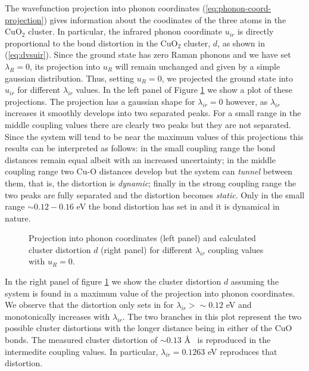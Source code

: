 The wavefunction projection into phonon coordinates (\ref{eq:phonon-coord-projection}) gives information about the coodinates of the three atoms in the CuO$_2$ cluster.
In particular, the infrared phonon coordinate $u_{ir}$ is directly proportional to the bond distortion in the CuO$_2$ cluster, $d$, as shown in (\ref{eq:dvsuir}).
Since the ground state has zero Raman phonons and we have set $\lambda_R=0$, its projection into $u_R$ will remain unchanged and given by a simple gaussian distribution.
Thus, setting $u_R=0$, we projected the ground state into $u_{ir}$ for different $\lambda_{ir}$ values.
In the left panel of Figure \ref{fig:uirCoupl} we show a plot of these projections.
The projection has a gaussian shape for $\lambda_{ir}=0$ however, as $\lambda_{ir}$ increases it smoothly develops into two separated peaks.
For a small range in the middle coupling values there are clearly two peaks but they are not separated. 
Since the system will tend to be near the maximum values of this projections this results can be interpreted as follows: in the small coupling range the bond distances remain equal albeit with an increased uncertainty; in the middle coupling range two Cu-O distances develop but the system can \textit{tunnel} between them, that is, the distortion is \textit{dynamic}; finally in the strong coupling range the two peaks are fully separated and the distortion becomes \textit{static}.
Only in the small range $\sim 0.12 - 0.16$ eV the bond distortion has set in and it is dynamical in nature.
%
\begin{figure}[ht]
  \centering
  
  \caption{Projection into phonon coordinates (left panel) and calculated cluster distortion $d$ (right panel) for different $\lambda_{ir}$ coupling values with $u_R=0$.}
  \label{fig:uirCoupl}
\end{figure}

In the right panel of figure \ref{fig:uirCoupl} we show the cluster distortion $d$ assuming the system is found in a maximum value of the projection into phonon coordinates.
We observe that the distortion only sets in for $\lambda_{ir} > \sim 0.12$ eV and monotonically increases with $\lambda_{ir}$.
The two branches in this plot represent the two possible cluster distortions with the longer distance being in either of the CuO bonds.
The measured cluster distortion of $\sim 0.13$ \AA\ \cite{MustredeLeon1990} is reproduced in the intermedite coupling values. 
In particular, $\lambda_{ir}=0.1263$ eV reproduces that distortion.

